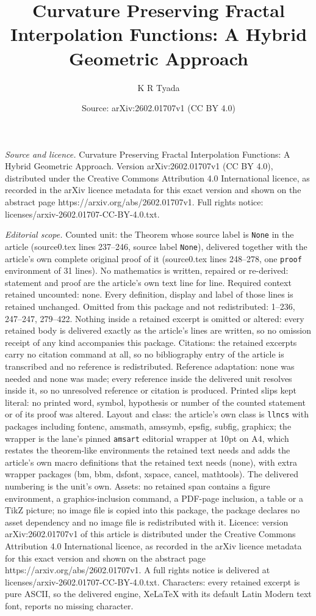 \documentclass[10pt,a4paper]{amsart}
\title[Curvature Preserving Fractal Interpolation Functions: A Hybr]{Curvature Preserving Fractal Interpolation Functions: A Hybrid Geometric Approach}
\author{K R Tyada}
\date{Source: arXiv:2602.01707v1 (CC BY 4.0)}
\begin{document}
\maketitle

\noindent\emph{Source and licence.} Curvature Preserving Fractal Interpolation Functions: A Hybrid Geometric Approach. Version arXiv:2602.01707v1 (CC BY 4.0), distributed under the Creative Commons Attribution 4.0 International licence, as recorded in the arXiv licence metadata for this exact version and shown on the abstract page https://arxiv.org/abs/2602.01707v1. Full rights notice: licenses/arxiv-2602.01707-CC-BY-4.0.txt.\par\smallskip

\noindent\textit{Editorial scope.} Counted unit: the Theorem whose source label is \texttt{None} in the article (source0.tex lines 237--246, source label \texttt{None}), delivered together with the article's own complete original proof of it (source0.tex lines 248--278, one \texttt{proof} environment of 31 lines). No mathematics is written, repaired or re-derived: statement and proof are the article's own text line for line. Required context retained uncounted: none. Every definition, display and label of those lines is retained unchanged. Omitted from this package and not redistributed: 1--236, 247--247, 279--422. Nothing inside a retained excerpt is omitted or altered: every retained body is delivered exactly as the article's lines are written, so no omission receipt of any kind accompanies this package. Citations: the retained excerpts carry no citation command at all, so no bibliography entry of the article is transcribed and no reference is redistributed. Reference adaptation: none was needed and none was made; every reference inside the delivered unit resolves inside it, so no unresolved reference or citation is produced. Printed slips kept literal: no printed word, symbol, hypothesis or number of the counted statement or of its proof was altered. Layout and class: the article's own class is \texttt{llncs} with packages including fontenc, amsmath, amssymb, epsfig, subfig, graphicx; the wrapper is the lane's pinned \texttt{amsart} editorial wrapper at 10pt on A4, which restates the theorem-like environments the retained text needs and adds the article's own macro definitions that the retained text needs (none), with extra wrapper packages (bm, bbm, dsfont, xspace, cancel, mathtools). The delivered numbering is the unit's own. Assets: no retained span contains a figure environment, a graphics-inclusion command, a PDF-page inclusion, a table or a TikZ picture; no image file is copied into this package, the package declares no asset dependency and no image file is redistributed with it. Licence: version arXiv:2602.01707v1 of this article is distributed under the Creative Commons Attribution 4.0 International licence, as recorded in the arXiv licence metadata for this exact version and shown on the abstract page https://arxiv.org/abs/2602.01707v1. A full rights notice is delivered at licenses/arxiv-2602.01707-CC-BY-4.0.txt. Characters: every retained excerpt is pure ASCII, so the delivered engine, XeLaTeX with its default Latin Modern text font, reports no missing character.
\end{document}
